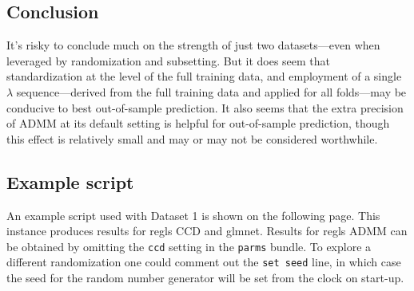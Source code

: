 \documentclass{article}
\begin{document}
\subsection*{Conclusion}

It's risky to conclude much on the strength of just two
datasets---even when leveraged by randomization and subsetting. But it
does seem that standardization at the level of the full training data,
and employment of a single $\lambda$ sequence---derived from the full
training data and applied for all folds---may be conducive to best
out-of-sample prediction. It also seems that the extra precision of
ADMM at its default setting is helpful for out-of-sample prediction,
though this effect is relatively small and may or may not be
considered worthwhile.

\subsection*{Example script}

An example script used with Dataset 1 is shown on the following page.
This instance produces results for \textsf{regls} CCD and
\textsf{glmnet}. Results for \textsf{regls} ADMM can be obtained by
omitting the \texttt{ccd} setting in the \texttt{parms} bundle.  To
explore a different randomization one could comment out the
\texttt{set seed} line, in which case the seed for the random number
generator will be set from the clock on start-up.

\clearpage
\end{document}
